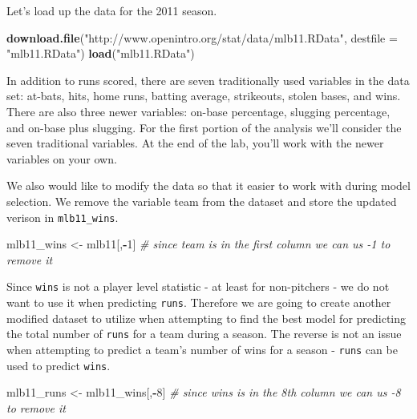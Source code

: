 \documentclass[]{book}
\newenvironment{Shaded}{\begin{snugshade}}{\end{snugshade}}
\newcommand{\KeywordTok}[1]{\textcolor[rgb]{0.13,0.29,0.53}{\textbf{#1}}}
\newcommand{\DataTypeTok}[1]{\textcolor[rgb]{0.13,0.29,0.53}{#1}}
\newcommand{\DecValTok}[1]{\textcolor[rgb]{0.00,0.00,0.81}{#1}}
\newcommand{\StringTok}[1]{\textcolor[rgb]{0.31,0.60,0.02}{#1}}
\newcommand{\CommentTok}[1]{\textcolor[rgb]{0.56,0.35,0.01}{\textit{#1}}}
\newcommand{\OperatorTok}[1]{\textcolor[rgb]{0.81,0.36,0.00}{\textbf{#1}}}
\newcommand{\NormalTok}[1]{#1}
\theoremstyle{definition}
\theoremstyle{definition}
\theoremstyle{definition}
\theoremstyle{remark}
\begin{document}
Let's load up the data for the 2011 season.

\begin{Shaded}
\begin{Highlighting}[]
\KeywordTok{download.file}\NormalTok{(}\StringTok{"http://www.openintro.org/stat/data/mlb11.RData"}\NormalTok{, }\DataTypeTok{destfile =} \StringTok{"mlb11.RData"}\NormalTok{)}
\KeywordTok{load}\NormalTok{(}\StringTok{"mlb11.RData"}\NormalTok{)}
\end{Highlighting}
\end{Shaded}

In addition to runs scored, there are seven traditionally used variables
in the data set: at-bats, hits, home runs, batting average, strikeouts,
stolen bases, and wins. There are also three newer variables: on-base
percentage, slugging percentage, and on-base plus slugging. For the
first portion of the analysis we'll consider the seven traditional
variables. At the end of the lab, you'll work with the newer variables
on your own.

We also would like to modify the data so that it easier to work with
during model selection. We remove the variable team from the dataset and
store the updated verison in \texttt{mlb11\_wins}.

\begin{Shaded}
\begin{Highlighting}[]
\NormalTok{mlb11_wins <-}\StringTok{ }\NormalTok{mlb11[,}\OperatorTok{-}\DecValTok{1}\NormalTok{] }\CommentTok{# since team is in the first column we can us -1 to remove it}
\end{Highlighting}
\end{Shaded}

Since \texttt{wins} is not a player level statistic - at least for
non-pitchers - we do not want to use it when predicting \texttt{runs}.
Therefore we are going to create another modified dataset to utilize
when attempting to find the best model for predicting the total number
of \texttt{runs} for a team during a season. The reverse is not an issue
when attempting to predict a team's number of wins for a season -
\texttt{runs} can be used to predict \texttt{wins}.

\begin{Shaded}
\begin{Highlighting}[]
\NormalTok{mlb11_runs <-}\StringTok{ }\NormalTok{mlb11_wins[,}\OperatorTok{-}\DecValTok{8}\NormalTok{] }\CommentTok{# since wins is in the 8th column we can us -8 to remove it}
\end{Highlighting}
\end{Shaded}
\end{document}
